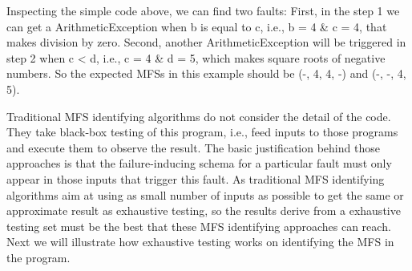 \documentclass{sig-alternate}
\begin{document}
Inspecting the simple code above, we can find two faults: First, in the step 1 we can get a ArithmeticException when b is equal to c, i.e.,  b = 4 \& c = 4, that makes division by zero. Second, another ArithmeticException will be triggered in step 2 when c < d, i.e., c = 4 \& d = 5, which makes square roots of negative numbers. So the expected MFSs in this example should be (-, 4, 4, -) and (-, -, 4, 5).

Traditional MFS identifying algorithms do not consider the detail of the code. They take black-box testing of this program, i.e., feed inputs to those programs and execute them to observe the result. The basic justification behind those approaches is that the failure-inducing schema for a particular fault must only appear in those inputs that trigger this fault. As traditional MFS identifying algorithms aim at using as small number of inputs as possible to get the same or approximate result as exhaustive testing, so the results derive from a exhaustive testing set must be the best that these MFS identifying approaches can reach. Next we will illustrate how exhaustive testing works on identifying the MFS in the program.
\end{document}
